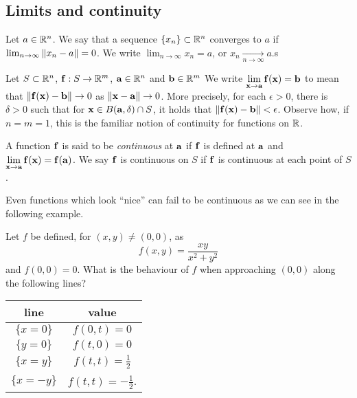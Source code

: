 \subsection*{Limits and continuity}

Let $a \in \bR^n$.
We say that a sequence $\{x_n\} \subset \bR^n$ converges to $a$ if
$\lim_{n\to \infty} \norm{x_n - a} = 0$. We write $\lim_{n\to\infty} x_n = a$, or $x_n \underset{n\to\infty}\to a$.s



Let \(S\subset \bR^n\), \(\ff : S \to \bR^m\),
\(\aa\in \bR^n\) and \(\bb\in \bR^m\)
We write
    {\(  \displaystyle\lim_{\xx \to \aa}\ff(\xx) = \bb \)}
to mean that
\(\norm{\ff(\xx)-\bb} \to 0\) as \(\norm{\xx-\aa}\to 0\).
More precisely, for each $\epsilon > 0$, there is $\delta > 0$ such that
for $\xx \in B(\aa, \delta) \cap S$, it holds that $\norm{\ff(\xx) - \bb} < \epsilon$.
Observe how, if \(n=m=1\), this is the familiar notion of continuity for functions on \(\bR\).

\begin{definition}[continuous]
    A function \(\ff\) is said to be \emph{continuous} at \(\aa\) if \(\ff\) is defined at \(\aa\) and
    \(  \displaystyle\lim_{\xx \to \aa}\ff(\xx) = \ff(\aa)\).
    We say \(\ff\) is continuous on \(S\) if \(\ff\) is continuous at each point of \(S\).
\end{definition}

Even functions which look ``nice'' can fail to be continuous as we can see in the following example.

\begin{example*}
    Let \(f\) be defined, for \((x,y)\neq (0,0)\), as
    \[
        f(x,y) =
        \frac{x y}{x^2 + y^2}
    \]
    and \(f(0,0)=0\).
    What is the behaviour of \(f\) when approaching \((0,0)\) along the following lines?
    \begin{center}
        \begin{tabular}{ c | c } %
            line         & value                     \\
            \midrule
            \(\{x=0\}\)  & \(f(0,t) =  0\)           \\
            \(\{y=0\}\)  & \(f(t,0) = 0\)            \\
            \(\{x=y\}\)  & \(f(t,t) = \frac{1}{2}\)  \\
            \(\{x=-y\}\) & \(f(t,t) =-\frac{1}{2}\).
        \end{tabular}
    \end{center}
\end{example*}

